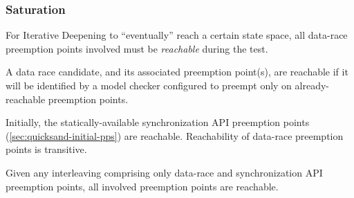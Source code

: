 \subsubsection{Saturation}

For Iterative Deepening to ``eventually'' reach a certain state space,
all data-race preemption points involved must be {\em reachable} during the test.

\begin{definition}[Reachability]
	A data race candidate, and its associated preemption point(s),
	are reachable if it will be identified by a model checker
	configured to preempt only on already-reachable preemption points.
\end{definition}

Initially, the statically-available synchronization API preemption points (\cref{sec:quicksand-initial-pps})
are reachable.
Reachability of data-race preemption points is transitive.

\begin{lemma}
        Given any interleaving comprising only data-race and synchronization API preemption points,
        all involved preemption points are reachable.
        \label{lem:saturation}
\end{lemma}

